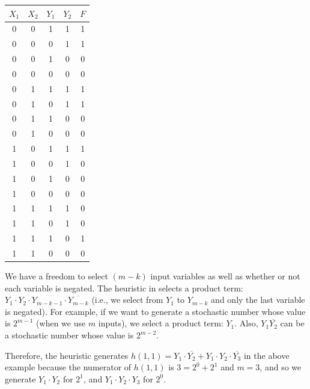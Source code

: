 \documentclass[10pt,conference]{IEEEtran}
\begin{document}
\begin{table}[ht]
{\begin{minipage}[b]{0.21\textwidth}
    \begin{tabular}{c c |c c| c}
    \hline
     $X_1$ & $X_2$ & $Y_1$ & $Y_2$ &$F$\\ \hline
        0 &0 &1 &1 &1\\ 
        0 &0 &0 &1 &1\\ 
        0 &0 &1 &0 &0\\ 
        0 &0 &0 &0 &0\\  \hline
        0 &1 &1 &1 &1\\ 
        0 &1 &0 &1 &1\\ 
        0 &1 &1 &0 &0\\ 
        0 &1 &0 &0 &0\\  \hline
        1 &0 &1 &1 &1\\ 
        1 &0 &0 &1 &0\\ 
        1 &0 &1 &0 &0\\ 
        1 &0 &0 &0 &0\\  \hline
        1 &1 &1 &1 &0\\ 
        1 &1 &0 &1 &0\\ 
        1 &1 &1 &0 &1\\ 
        1 &1 &0 &0 &0\\  \hline

    \end{tabular}
    \end{minipage}}
    
    
  
\end{table}
\par
We have a freedom to select $(m-k)$ input variables as well
as whether or not each variable is negated. The heuristic in  \cite{fifteen}
selects a product term: $Y_1 \cdot Y_2 \cdot Y_{m-k-1} \cdot \overline{Y_{m-k}}$ (i.e., we select
from $Y_1$ to $Y_{m-k}$ and only the last variable is negated). For
example, if we want to generate a stochastic number whose
value is ${2}^{m-1}$ (when we use $m$ inputs), we select a product
term: $Y_1$. Also, $Y_1\overline{Y_2}$ can be a stochastic number whose value
is ${2}^{m-2}$.

\par
Therefore, the heuristic generates $h(1, 1) = Y_1 \cdot \overline{Y_2} + Y_1 \cdot
Y_2 \cdot \overline{Y_3}$ in the above example because the numerator of $h(1, 1)$
is $3 =2^0 + 2^1$ and $m = 3$, and so we generate $Y_1 \cdot Y_2$ for $2^1$,
and $Y_1 \cdot Y_2 \cdot Y_3$ for $2^0$. 
\end{document}
